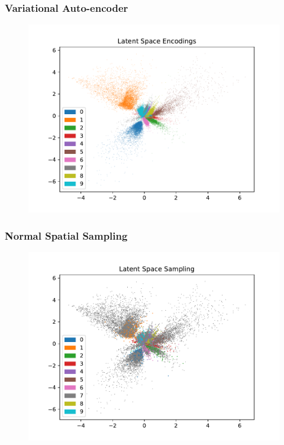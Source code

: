 \documentclass[10pt, usenames, dvipsnames, table]{beamer}
\begin{document}
\begin{frame}
  \frametitle{Variational Auto-encoder}
  \begin{figure}
    \centering
    \includegraphics[width=\linewidth]
    {models/mnist_vae_e300_L2_b64/encodings}
    \caption{}
    \label{}
  \end{figure}
\end{frame}

\begin{frame}
  \frametitle{Normal Spatial Sampling}
  \begin{figure}
    \centering
    \includegraphics[width=\linewidth]
    {models/mnist_vae_e300_L2_b64/multi-normal_sampling_1000}
    \caption{}
    \label{}
  \end{figure}
\end{frame}
\end{document}

